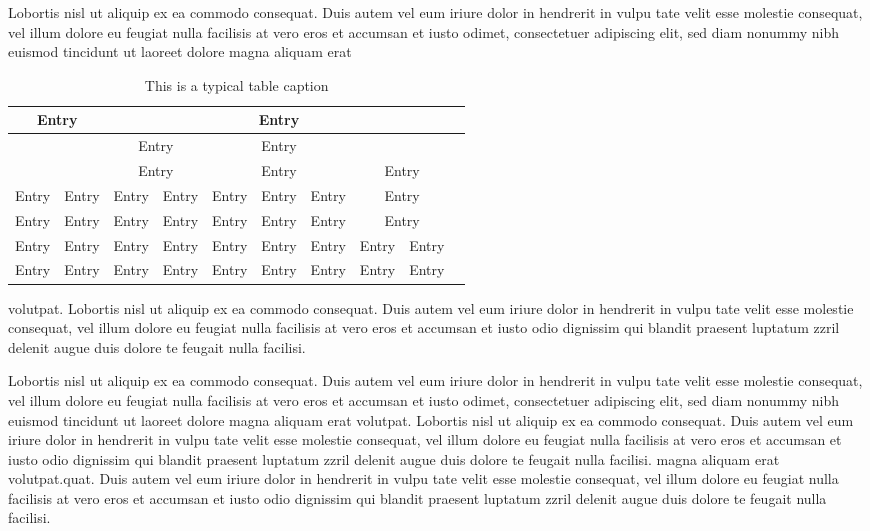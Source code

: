 \documentclass[a4paper, oneside, twocolumn, notitlepage, 10pt]{style/extarticle_ecoc2015}
\begin{document}
Lobortis nisl ut aliquip ex ea commodo consequat. Duis autem vel eum
iriure dolor in hendrerit in vulpu tate velit esse molestie
consequat, vel illum dolore eu feugiat nulla facilisis at vero eros
et accumsan et iusto odimet, consectetuer adipiscing elit, sed diam
nonummy nibh euismod tincidunt ut laoreet dolore magna aliquam erat

\begin{table*}
   \centering
\caption{This is a typical table caption}
\label{tab:table2}%
      \begin{tabular}{|l|r|r|c|c|c|c|c|r|r|}
         \hline  \multicolumn{2}{|c|}{Entry}  &  \multicolumn{7}{|c|}{Entry} \\
         \hline  \multicolumn{2}{|c|}{ }  &  \multicolumn{2}{|c|}{Entry}  &  \multicolumn{3}{|c|}{Entry}  &  \multicolumn{2}{|c|}{ }  \\
         \multicolumn{2}{|c|}{ }  &  \multicolumn{2}{|c|}{Entry}  &  \multicolumn{3}{|c|}{Entry}  &  \multicolumn{2}{|c|}{Entry} \\
         \hline Entry  &  Entry   &   Entry &  Entry   &  Entry  &  Entry  &  Entry  &  \multicolumn{2}{|c|}{Entry} \\
         \hline Entry  &  Entry  &  Entry &  Entry  &  Entry  &  Entry   & Entry  &  \multicolumn{2}{|c|}{Entry} \\
         \hline  Entry    &   Entry    &  Entry    &  Entry   &   Entry    &   Entry  &      Entry  &    Entry   &  Entry      \\
         \hline  Entry  &   Entry  &  Entry  &  Entry      &  Entry    &   Entry   &     Entry  &   Entry   &  Entry  \\
         \hline
      \end{tabular}
\end{table*}

volutpat. Lobortis nisl ut aliquip ex ea commodo consequat. Duis
autem vel eum iriure dolor in hendrerit in vulpu tate velit esse
molestie consequat, vel illum dolore eu feugiat nulla facilisis at
vero eros et accumsan et iusto odio dignissim qui blandit praesent
luptatum zzril delenit augue duis dolore te feugait nulla facilisi.

Lobortis nisl ut aliquip ex ea commodo consequat. Duis autem vel eum
iriure dolor in hendrerit in vulpu tate velit esse molestie
consequat, vel illum dolore eu feugiat nulla facilisis at vero eros
et accumsan et iusto odimet, consectetuer adipiscing elit, sed diam
nonummy nibh euismod tincidunt ut laoreet dolore magna aliquam erat
volutpat. Lobortis nisl ut aliquip ex ea commodo consequat. Duis
autem vel eum iriure dolor in hendrerit in vulpu tate velit esse
molestie consequat, vel illum dolore eu feugiat nulla facilisis at
vero eros et accumsan et iusto odio dignissim qui blandit praesent
luptatum zzril delenit augue duis dolore te feugait nulla facilisi.
magna aliquam erat volutpat.quat. Duis autem vel eum iriure dolor in
hendrerit in vulpu tate velit esse molestie consequat, vel illum
dolore eu feugiat nulla facilisis at vero eros et accumsan et iusto
odio dignissim qui blandit praesent luptatum zzril delenit augue
duis dolore te feugait nulla facilisi.
\end{document}
